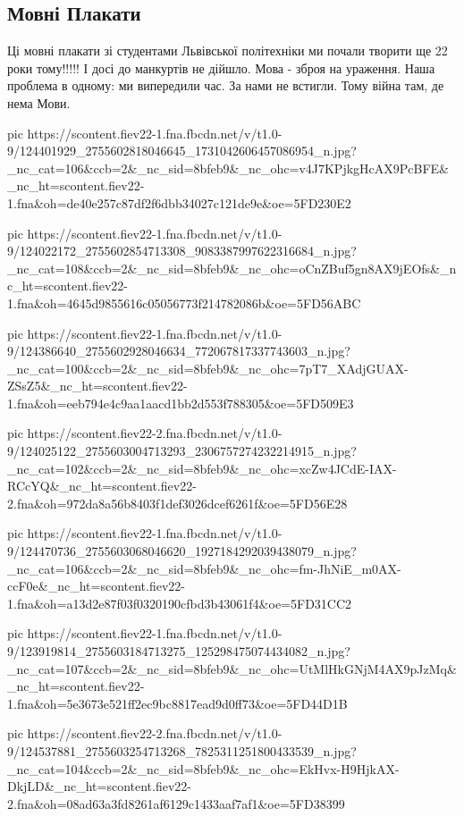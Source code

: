  
 
 

\subsection{Мовні Плакати}
\label{sec:09_11_2020.fb.iryna_farion.1.mova_plakaty}

Ці мовні плакати зі студентами Львівської політехніки ми почали творити ще 22
роки тому!!!!! І досі до манкуртів не дійшло. Мова - зброя на ураження. Наша
проблема в одному: ми випередили час. За нами не встигли. Тому війна там, де
нема Мови.

\ifcmt
pic https://scontent.fiev22-1.fna.fbcdn.net/v/t1.0-9/124401929_2755602818046645_1731042606457086954_n.jpg?_nc_cat=106&ccb=2&_nc_sid=8bfeb9&_nc_ohc=v4J7KPjkgHcAX9PcBFE&_nc_ht=scontent.fiev22-1.fna&oh=de40e257c87df2f6dbb34027c121de9e&oe=5FD230E2

pic https://scontent.fiev22-1.fna.fbcdn.net/v/t1.0-9/124022172_2755602854713308_9083387997622316684_n.jpg?_nc_cat=108&ccb=2&_nc_sid=8bfeb9&_nc_ohc=oCnZBuf5gn8AX9jEOfs&_nc_ht=scontent.fiev22-1.fna&oh=4645d9855616c05056773f214782086b&oe=5FD56ABC

pic https://scontent.fiev22-1.fna.fbcdn.net/v/t1.0-9/124386640_2755602928046634_772067817337743603_n.jpg?_nc_cat=100&ccb=2&_nc_sid=8bfeb9&_nc_ohc=7pT7_XAdjGUAX-ZSsZ5&_nc_ht=scontent.fiev22-1.fna&oh=eeb794e4c9aa1aacd1bb2d553f788305&oe=5FD509E3

pic https://scontent.fiev22-2.fna.fbcdn.net/v/t1.0-9/124025122_2755603004713293_2306757274232214915_n.jpg?_nc_cat=102&ccb=2&_nc_sid=8bfeb9&_nc_ohc=xcZw4JCdE-IAX-RCcYQ&_nc_ht=scontent.fiev22-2.fna&oh=972da8a56b8403f1def3026dcef6261f&oe=5FD56E28

pic https://scontent.fiev22-1.fna.fbcdn.net/v/t1.0-9/124470736_2755603068046620_1927184292039438079_n.jpg?_nc_cat=106&ccb=2&_nc_sid=8bfeb9&_nc_ohc=fm-JhNiE_m0AX-ccF0e&_nc_ht=scontent.fiev22-1.fna&oh=a13d2e87f03f0320190cfbd3b43061f4&oe=5FD31CC2

pic https://scontent.fiev22-1.fna.fbcdn.net/v/t1.0-9/123919814_2755603184713275_125298475074434082_n.jpg?_nc_cat=107&ccb=2&_nc_sid=8bfeb9&_nc_ohc=UtMlHkGNjM4AX9pJzMq&_nc_ht=scontent.fiev22-1.fna&oh=5e3673e521ff2ec9bc8817ead9d0ff73&oe=5FD44D1B

pic https://scontent.fiev22-2.fna.fbcdn.net/v/t1.0-9/124537881_2755603254713268_7825311251800433539_n.jpg?_nc_cat=104&ccb=2&_nc_sid=8bfeb9&_nc_ohc=EkHvx-H9HjkAX-DkjLD&_nc_ht=scontent.fiev22-2.fna&oh=08ad63a3fd8261af6129c1433aaf7af1&oe=5FD38399

\fi
